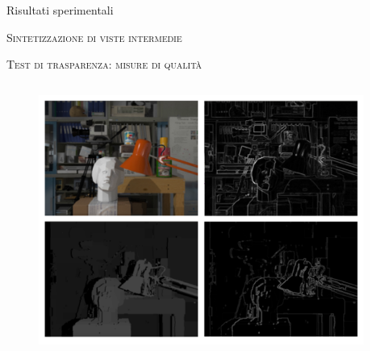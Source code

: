 \documentclass{beamer}
\begin{document}
\begin{section}{Risultati sperimentali}
\begin{frame}[t]{\textsc{Sintetizzazione di viste intermedie}}
\end{frame}



\begin{frame}[t]{\textsc{Test di trasparenza: misure di qualit\`{a} }}
\vspace{-13mm}
\begin{columns}
\begin{column}{5cm}
\begin{center}
\vspace{10mm}
\begin{figure}
  \includegraphics[width=1\textwidth]{./img_wat/quality.png}  
  \caption{} 
  \label{fig:qm}
\end{figure}
\end{center}
\end{column}
\begin{column}{5cm}
\vspace{-8mm}
\begin{center}
\end{center}

\vspace{1mm}
\begin{center}

\end{center}

\end{column}


\end{columns}
\end{frame}
\end{section}
\end{document}
